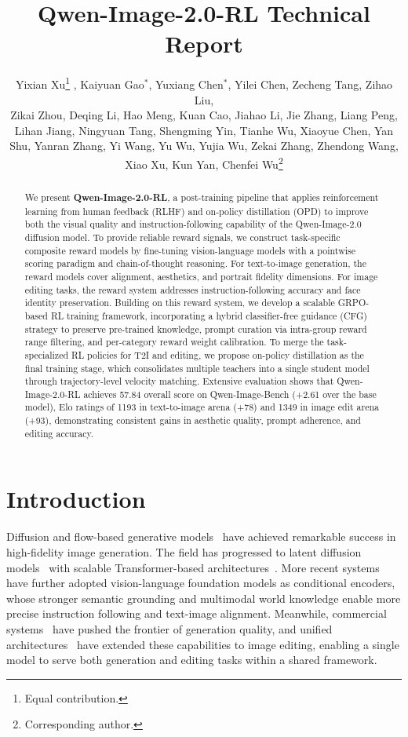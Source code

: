 \documentclass{article} %
\title{Qwen-Image-2.0-RL Technical Report}
\author{  Yixian Xu\thanks{Equal contribution.} , Kaiyuan Gao$^*$, Yuxiang Chen$^*$, Yilei Chen,  Zecheng Tang, Zihao Liu, \\ Zikai Zhou, Deqing Li, Hao Meng, Kuan Cao, Jiahao Li, Jie Zhang, Liang Peng, \\ Lihan Jiang, Ningyuan Tang, Shengming Yin, Tianhe Wu, Xiaoyue Chen, Yan Shu, Yanran Zhang, Yi Wang, Yu Wu, Yujia Wu, Zekai Zhang, Zhendong Wang, \\Xiao Xu, Kun Yan, Chenfei Wu\thanks{Corresponding author.}}
\begin{document}
\maketitle
\begin{abstract}
We present \textbf{Qwen-Image-2.0-RL}, a post-training pipeline that applies reinforcement learning from human feedback (RLHF) and on-policy distillation (OPD) to improve both the visual quality and instruction-following capability of the Qwen-Image-2.0 diffusion model. To provide reliable reward signals, we construct task-specific composite reward models by fine-tuning vision-language models with a pointwise scoring paradigm and chain-of-thought reasoning. For text-to-image generation, the reward models cover alignment, aesthetics, and portrait fidelity dimensions. For image editing tasks, the reward system addresses instruction-following accuracy and face identity preservation. Building on this reward system, we develop a scalable GRPO-based RL training framework, incorporating a hybrid classifier-free guidance (CFG) strategy to preserve pre-trained knowledge, prompt curation via intra-group reward range filtering, and per-category reward weight calibration. To merge the task-specialized RL policies for T2I and editing, we propose on-policy distillation as the final training stage, which consolidates multiple teachers into a single student model through trajectory-level velocity matching. Extensive evaluation shows that Qwen-Image-2.0-RL achieves 57.84 overall score on Qwen-Image-Bench (+2.61 over the base model), Elo ratings of 1193 in text-to-image arena (+78) and 1349 in image edit arena (+93),  demonstrating consistent gains in aesthetic quality, prompt adherence, and editing accuracy.
\end{abstract}

\section{Introduction}
Diffusion and flow-based generative models~\citep{sohl2015deep,ho2020denoising,song2021score} have achieved remarkable success in high-fidelity image generation. The field has progressed to latent diffusion models~\citep{rombach2021highresolution,podell2023sdxl}  with scalable Transformer-based architectures~\citep{peebles2023scalable,chen2024pixartalpha,esser2024scaling,ma2024sit}. More recent systems~\citep{flux2024,flux-2-2025,wu2025qwen,cai2025z,Cao2025HunyuanImage3T} have further adopted vision-language foundation models as conditional encoders, whose stronger semantic grounding and multimodal world knowledge enable more precise instruction following and text-image alignment. Meanwhile, commercial systems~\citep{gao2025seedream,seedream2025seedream,gpt-image-1.5,nano-pro} have pushed the frontier of generation quality, and unified architectures~\citep{wu2025qwen,labs2025kontext} have extended these capabilities to image editing, enabling a single model to serve both generation and editing tasks within a shared framework.
\end{document}
